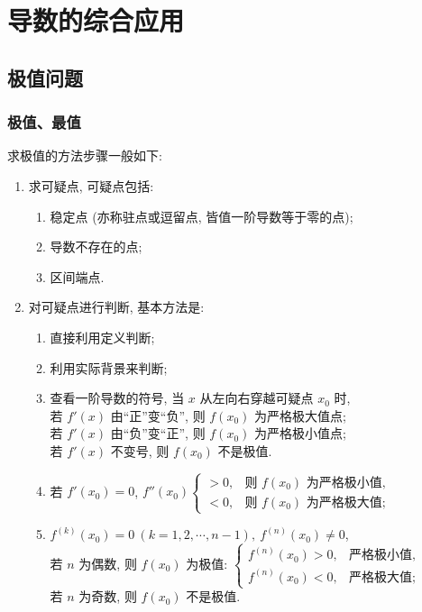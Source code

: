 \section{导数的综合应用}

\subsection{极值问题}

\subsubsection{极值、最值}

求极值的方法步骤一般如下:
\begin{enumerate}[label=(\arabic{*})]
    \item 求可疑点, 可疑点包括:
          \begin{enumerate}[label=(\roman{*})]
              \item 稳定点 (亦称驻点或逗留点, 皆值一阶导数等于零的点);
              \item 导数不存在的点;
              \item 区间端点.
          \end{enumerate}
    \item 对可疑点进行判断, 基本方法是:
          \begin{enumerate}[label=(\roman{*})]
              \item 直接利用定义判断;
              \item 利用实际背景来判断;
              \item 查看一阶导数的符号, 当 $x$ 从左向右穿越可疑点 $x_0$ 时, \\
                    若 $f'(x)$ 由“正”变“负”, 则 $f(x_0)$ 为严格极大值点;\\
                    若 $f'(x)$ 由“负”变“正”, 则 $f(x_0)$ 为严格极小值点;\\
                    若 $f'(x)$ 不变号, 则 $f(x_0)$ 不是极值.
              \item 若 $f'(x_0)=0$, $f''(x_0)\begin{cases}
                            >0 , & \text{则 } f(x_0) \text{ 为严格极小值,} \\
                            <0 , & \text{则 } f(x_0) \text{ 为严格极大值;}
                        \end{cases}$
              \item $f^{(k)}(x_0)=0~ (k=1,2,\cdots,n-1),~f^{(n)}(x_0)\neq 0$, \\
                    若 $n$ 为偶数, 则 $f(x_0)$ 为极值: $\begin{cases}
                            f^{(n)}(x_0)>0 , & \text{严格极小值,} \\
                            f^{(n)}(x_0)<0 , & \text{严格极大值;}
                        \end{cases}$\\
                    若 $n$ 为奇数, 则 $f(x_0)$ 不是极值.
          \end{enumerate}
\end{enumerate}

